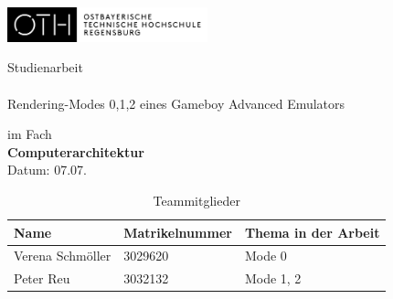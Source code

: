 \begin{titlepage}

\includegraphics[height=10mm]{img/OTHLogo.jpg}

\vspace{10mm}

\begin{center}
\Huge Studienarbeit \\ 
\large \ \\
\Large Rendering-Modes 0,1,2 eines Gameboy Advanced Emulators 

\vspace{20mm}

im Fach \\
\textbf{Computerarchitektur} \\

Datum: 07.07.\the\year
\vspace{70mm}

\end{center}
\begin{table}[h]
\centering
\begin{tabular}{|l|l|l|}
\hline
\textbf{Name}    & \textbf{Matrikelnummer} & \textbf{Thema in der Arbeit} \\ \hline
Verena Schmöller & 3029620                 & Mode 0                       \\ \hline
Peter Reu        & 3032132                 & Mode 1, 2                    \\ \hline
\end{tabular}
\caption{Teammitglieder}
\label{Teammitglieder}
\end{table}






\end{titlepage}